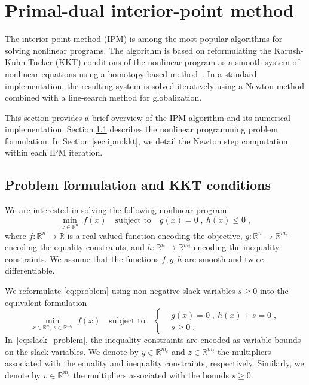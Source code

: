 \documentclass[smallextended]{svjour3}
\begin{document}
\section{Primal-dual interior-point method}

The interior-point method (IPM) is among the most popular algorithms
for solving nonlinear programs. The algorithm is based on
reformulating the Karush-Kuhn-Tucker (KKT) conditions of the nonlinear program as a smooth
system of nonlinear equations using a homotopy-based method~\cite{nocedal_numerical_2006}.
In a standard implementation, the resulting system is solved iteratively using a Newton method combined with a line-search method for globalization.

This section provides a brief overview of the IPM algorithm and its numerical implementation.
Section \ref{sec:ipm:problem} describes the nonlinear programming problem formulation.
In Section \ref{sec:ipm:kkt}, we detail the Newton step computation within each IPM iteration.

\subsection{Problem formulation and KKT conditions}
\label{sec:ipm:problem}
We are interested in solving the following nonlinear program:
\begin{equation}
  \label{eq:problem}
    \min_{x \in \mathbb{R}^n} \;  f(x)
\quad \text{subject to}\quad
     g(x) = 0 \; , ~ h(x) \leq 0 \; ,
\end{equation}
where $f:\mathbb{R}^n \to \mathbb{R}$ is a real-valued function
encoding the objective, $g: \mathbb{R}^n \to \mathbb{R}^{m_e}$
encoding the equality constraints, and $h: \mathbb{R}^{n} \to
\mathbb{R}^{m_i}$ encoding the inequality constraints.
We assume that the functions $f, g, h$ are smooth
and twice differentiable.

We reformulate \eqref{eq:problem} using non-negative slack variables $s \geq 0$
into the equivalent formulation
\begin{equation}
  \label{eq:slack_problem}
    \min_{x \in \mathbb{R}^n, ~ s \in \mathbb{R}^{m_i}} \;  f(x)
    \quad \text{subject to} \quad
    \left\{
  \begin{aligned}
    & g(x) = 0 \; , ~ h(x) + s = 0 \; , \\
      &  s \geq 0  \; .
  \end{aligned}
  \right.
\end{equation}
In~\eqref{eq:slack_problem}, the inequality constraints
are encoded as variable bounds on the slack variables.
We denote by $y \in \mathbb{R}^{m_e}$ and $z \in \mathbb{R}^{m_i}$ the multipliers associated
with the equality and inequality constraints, respectively.
Similarly, we denote by $v \in \mathbb{R}^{m_i}$ the multipliers associated
with the bounds $s \geq 0$.
\end{document}
